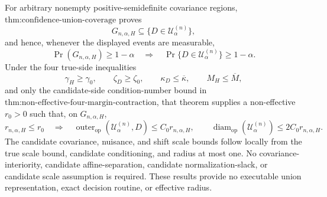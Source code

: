 For arbitrary nonempty positive-semidefinite covariance regions, \(\text{thm:confidence-union-coverage}\) proves
\[
G_{n,\alpha,H}\subseteq\{D\in\mathcal U^{(n)}_\alpha\},
\]
and hence, whenever the displayed events are measurable,
\[
\Pr(G_{n,\alpha,H})\geq1-\alpha
\quad\Longrightarrow\quad
\Pr\{D\in\mathcal U^{(n)}_\alpha\}\geq1-\alpha.
\]
Under the four true-side inequalities
\[
\gamma_H\geq\gamma_0,
\qquad
\zeta_D\geq\zeta_0,
\qquad
\kappa_D\leq\overline\kappa,
\qquad
M_H\leq\overline M,
\]
and only the candidate-side condition-number bound in \(\text{thm:non-effective-four-margin-contraction}\), that theorem supplies a non-effective \(r_0>0\) such that, on \(G_{n,\alpha,H}\),
\[
r_{n,\alpha,H}\leq r_0
\quad\Longrightarrow\quad
\operatorname{outer}_{\mathrm{op}}(\mathcal U^{(n)}_\alpha,D)
\leq C_0r_{n,\alpha,H},
\qquad
\operatorname{diam}_{\mathrm{op}}(\mathcal U^{(n)}_\alpha)
\leq2C_0r_{n,\alpha,H}.
\]
The candidate covariance, nuisance, and shift scale bounds follow locally from the true scale bound, candidate conditioning, and radius at most one. No covariance-interiority, candidate affine-separation, candidate normalization-slack, or candidate scale assumption is required. These results provide no executable union representation, exact decision routine, or effective radius.